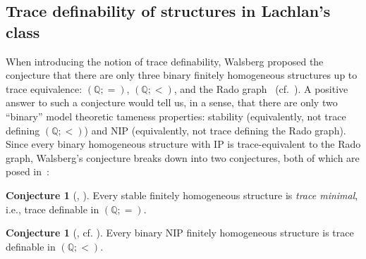 \documentclass{amsart}
\theoremstyle{definition}
\newtheorem{conjecture}[theorem]{Conjecture}
\theoremstyle{remark}
\numberwithin{equation}{section}
\begin{document}
\subsection{Trace definability of structures in Lachlan's class}\label{sec:tracedeflach}
When introducing the notion of trace definability, Walsberg proposed the conjecture that there are only three binary finitely homogeneous structures up to trace equivalence: $(\mathbb{Q}; =)$, $(\mathbb{Q};<)$, and the Rado graph~\cite[Conjecture 2.11]{walsberg2026tracedefinabilityipreservation} (cf.~\cite[Conjecture 13.1]{Walsberglong}). 
A positive answer to such a conjecture would tell us, in a sense, that there are only two ``binary'' model theoretic tameness properties: stability (equivalently, not trace defining $(\mathbb{Q}; <)$) and $\mathrm{NIP}$ (equivalently, not trace defining the Rado graph). Since every binary homogeneous structure with $\mathrm{IP}$ is trace-equivalent to the Rado graph, Walsberg's conjecture breaks down into two conjectures, both of which are posed in~\cite{Walsbergshort, Walsberglong}:
\begin{conjecture}[{\cite[Section 9.4]{Walsbergshort}, \cite[p.157]{Walsberglong}}]\label{conj: answered}
    Every stable finitely homogeneous structure is \emph{trace minimal}, i.e., trace definable in $(\mathbb{Q}; =)$.
\end{conjecture}
\begin{conjecture}[{\cite[Section 9.4 (3)]{Walsbergshort}, cf. \cite[Conjecture 13.1]{Walsberglong}}]\label{conj: unanswered}
    Every binary $\mathrm{NIP}$ finitely homogeneous structure is trace definable in $(\mathbb{Q}; <)$. 
\end{conjecture}


\end{document}
